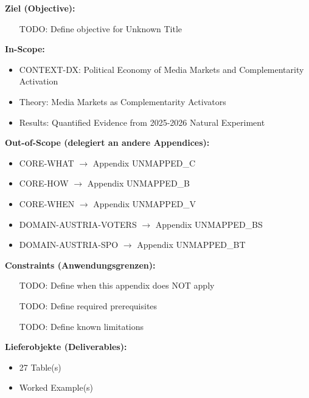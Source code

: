 \begin{tcolorbox}[
    colback=orange!5!white,
    colframe=orange!75!black,
    title={\textbf{Appendix Scope: Ziel / In-Scope / Out-of-Scope / Constraints}},
    fonttitle=\bfseries
]

\textbf{Ziel (Objective):}
\begin{itemize}[nosep]
    \item [TODO: Define objective for Unknown Title]
\end{itemize}

\textbf{In-Scope:}
\begin{itemize}[nosep]
    \item CONTEXT-DX: Political Economy of Media Markets and Complementarity Activation
    \item Theory: Media Markets as Complementarity Activators
    \item Results: Quantified Evidence from 2025-2026 Natural Experiment
\end{itemize}

\textbf{Out-of-Scope (delegiert an andere Appendices):}
\begin{itemize}[nosep]
    \item CORE-WHAT $\rightarrow$ Appendix UNMAPPED_C
    \item CORE-HOW $\rightarrow$ Appendix UNMAPPED_B
    \item CORE-WHEN $\rightarrow$ Appendix UNMAPPED_V
    \item DOMAIN-AUSTRIA-VOTERS $\rightarrow$ Appendix UNMAPPED_BS
    \item DOMAIN-AUSTRIA-SPO $\rightarrow$ Appendix UNMAPPED_BT
\end{itemize}

\textbf{Constraints (Anwendungsgrenzen):}
\begin{itemize}[nosep]
    \item [TODO: Define when this appendix does NOT apply]
    \item [TODO: Define required prerequisites]
    \item [TODO: Define known limitations]
\end{itemize}

\textbf{Lieferobjekte (Deliverables):}
\begin{itemize}[nosep]
    \item 27 Table(s)
    \item Worked Example(s)
\end{itemize}

\end{tcolorbox}


